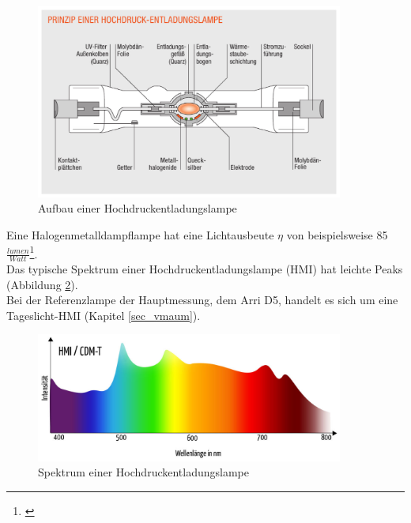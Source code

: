\begin{figure}[htp]     %
\centering
\includegraphics[width=0.9\textwidth]{bilder/hochdruck} 
\caption {Aufbau einer Hochdruckentladungslampe\protect\footnotemark}\label{b_hochdruck}
\end{figure}

\noindent Eine Halogenmetalldampflampe hat eine Lichtausbeute $\eta$ von beispielsweise 85 $\frac{lumen}{Watt}$\footnote{\cite[35]{greule}}.\\ Das typische Spektrum einer Hochdruckentladungslampe (HMI) hat leichte Peaks (Abbildung \ref{b_hmi}).\\ Bei der Referenzlampe der Hauptmessung, dem Arri D5, handelt es sich um eine Tageslicht-HMI (Kapitel {\ref{sec_vmaum}}). 

\begin{figure}[H]     %
\centering
\includegraphics[width=0.9\textwidth]{bilder/hmi} 
\caption {Spektrum einer Hochdruckentladungslampe\protect\footnotemark}\label{b_hmi}
\end{figure}

